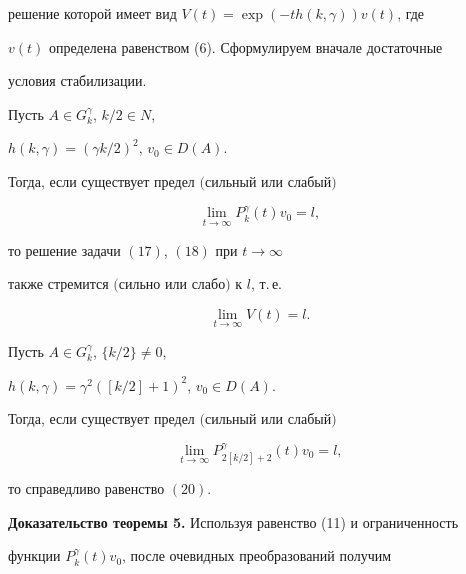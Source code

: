 решение которой имеет вид $V(t)=\exp(-th(k,\gamma))v(t)$, где


$v(t)$ определена равенством (6). Сформулируем вначале достаточные


условия стабилизации.





\begin{thm}


Пусть $A\in G_k^\gamma$, $k/2\in N$,


$h(k,\gamma)=(\gamma k/2)^2$, $v_0\in D(A)$.


Тогда, если существует предел $($сильный или слабый$)$


\begin{equation}


\lim_{t\to\infty}P_k^\gamma(t)v_0=l,


\end{equation}


то решение задачи $(17)$, $(18)$ при $t\to\infty$


также стремится $($сильно или слабо$)$ к $l$, т.\,е.


\begin{equation}


\lim_{t\to\infty}V(t)=l.


\end{equation}


\end{thm}





\begin{thm}


Пусть $A\in G_k^\gamma$, $\{k/2\}\neq0$,


$h(k,\gamma)=\gamma^2([k/2]+1)^2$, $v_0\in D(A)$.


Тогда, если существует предел $($сильный или слабый$)$


$$


\lim_{t\to\infty}P_{2[ k/2]+2}^\gamma(t)v_0=l,


$$


то справедливо равенство $(20)$.


\end{thm}





{\bf Доказательство теоремы 5.} Используя равенство (11) и ограниченность


функции $P_k^\gamma(t)v_0$, после очевидных преобразований получим


